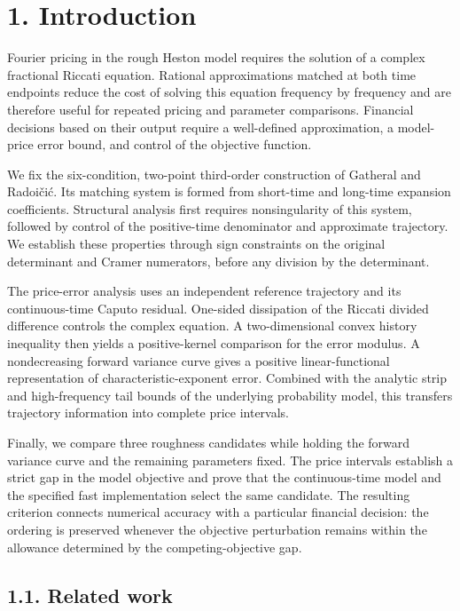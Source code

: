 \documentclass[a4paper,11pt]{article}
\begin{document}
\section*{1. Introduction}

Fourier pricing in the rough Heston model requires the solution of a complex fractional Riccati equation. Rational approximations matched at both time endpoints reduce the cost of solving this equation frequency by frequency and are therefore useful for repeated pricing and parameter comparisons. Financial decisions based on their output require a well-defined approximation, a model-price error bound, and control of the objective function.

We fix the six-condition, two-point third-order construction of Gatheral and Radoičić. Its matching system is formed from short-time and long-time expansion coefficients. Structural analysis first requires nonsingularity of this system, followed by control of the positive-time denominator and approximate trajectory. We establish these properties through sign constraints on the original determinant and Cramer numerators, before any division by the determinant.

The price-error analysis uses an independent reference trajectory and its continuous-time Caputo residual. One-sided dissipation of the Riccati divided difference controls the complex equation. A two-dimensional convex history inequality then yields a positive-kernel comparison for the error modulus. A nondecreasing forward variance curve gives a positive linear-functional representation of characteristic-exponent error. Combined with the analytic strip and high-frequency tail bounds of the underlying probability model, this transfers trajectory information into complete price intervals.

Finally, we compare three roughness candidates while holding the forward variance curve and the remaining parameters fixed. The price intervals establish a strict gap in the model objective and prove that the continuous-time model and the specified fast implementation select the same candidate. The resulting criterion connects numerical accuracy with a particular financial decision: the ordering is preserved whenever the objective perturbation remains within the allowance determined by the competing-objective gap.

\subsection*{1.1. Related work}
\end{document}
